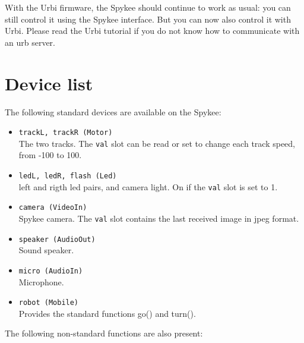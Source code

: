 With the Urbi firmware, the Spykee should continue to work as usual: you can
still control it using the Spykee interface. But you can now also control it
with Urbi. Please read the Urbi tutorial if you do not know how to communicate
with an urb server.

\section{Device list}

The following standard devices are available on the Spykee:

\begin{itemize}
\item \lstinline|trackL, trackR (Motor)| \\
    The two tracks. The \lstinline|val| slot can be read or set to change each
    track speed, from -100 to 100.
\item \lstinline|ledL, ledR, flash (Led)| \\
    left and rigth led pairs, and camera light. On if the \lstinline|val| slot
    is set to 1.
\item \lstinline|camera (VideoIn)| \\
    Spykee camera. The \lstinline|val| slot contains the last received image
    in jpeg format.
\item \lstinline|speaker (AudioOut)| \\
    Sound speaker.
\item \lstinline|micro (AudioIn)| \\
    Microphone.
\item \lstinline|robot (Mobile)| \\
    Provides the standard functions go() and turn().
\end{itemize}

The following non-standard functions are also present:


